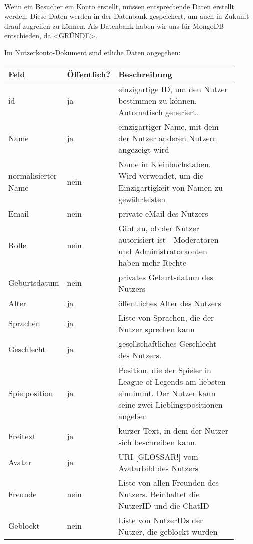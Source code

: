 \paragraph{}
Wenn ein Besucher ein Konto erstellt, müssen entsprechende Daten erstellt werden. Diese Daten werden in der Datenbank gespeichert, um auch in Zukunft drauf zugreifen zu können. Als Datenbank haben wir uns für MongoDB entschieden, da <GRÜNDE>.

Im Nutzerkonto-Dokument sind etliche Daten angegeben:

\begin{center}
    \begin{tabular}{ |p{0.15\linewidth}|p{0.12\linewidth}|p{0.64\linewidth}| } 
     \hline
     Feld & Öffentlich? & Beschreibung \\ 
     \hline
      id & ja & einzigartige ID, um den Nutzer bestimmen zu können. Automatisch generiert.\\
      Name & ja & einzigartiger Name, mit dem der Nutzer anderen Nutzern angezeigt wird \\
      normalisierter Name & nein & Name in Kleinbuchstaben. Wird verwendet, um die Einzigartigkeit von Namen zu gewährleisten \\ 
      Email & nein & private eMail des Nutzers \\
      Rolle & nein & Gibt an, ob der Nutzer autorisiert ist - Moderatoren und Administratorkonten haben mehr Rechte \\ 
      Geburtsdatum & nein & privates Geburtsdatum des Nutzers \\ 
      Alter & ja & öffentliches Alter des Nutzers \\ 
       Sprachen & ja & Liste von Sprachen, die der Nutzer sprechen kann \\
       Geschlecht & ja & gesellschaftliches Geschlecht des Nutzers. \\ 
       Spielposition & ja & Position, die der Spieler in League of Legends am liebsten einnimmt. Der Nutzer kann seine zwei Lieblingspositionen angeben \\ 
       Freitext & ja & kurzer Text, in dem der Nutzer sich beschreiben kann. \\
       Avatar & ja & URI [GLOSSAR!] vom Avatarbild des Nutzers \\ 
        Freunde & nein & Liste von allen Freunden des Nutzers. Beinhaltet die NutzerID und die ChatID \\ 
        Geblockt & nein & Liste von NutzerIDs der Nutzer, die geblockt wurden \\ 

     \hline
    \end{tabular}
\end{center}

